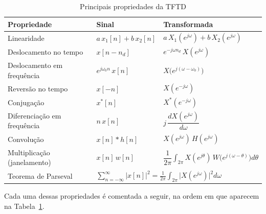 \documentclass[
    12pt,
    openright,
    oneside,
    a4paper,
    chapter=TITLE,
    section=TITLE,
    brazil
]{abntex2}
\begin{document}
\begin{table}[H]
\centering
\caption{Principais propriedades da TFTD}
\label{tab:propriedades}
\small
\begin{tabular}{@{}p{4.6cm}p{3.5cm}p{5.9cm}@{}}
\toprule
\textbf{Propriedade} & \textbf{Sinal} & \textbf{Transformada} \\
\midrule
Linearidade &
$a\,x_1[n] + b\,x_2[n]$ &
$a\,X_1(e^{j\omega}) + b\,X_2(e^{j\omega})$ \\[2pt]

Deslocamento no tempo &
$x[n-n_d]$ &
$e^{-j\omega n_d}\,X(e^{j\omega})$ \\[2pt]

Deslocamento em frequência &
$e^{j\omega_0 n}\,x[n]$ &
$X\big(e^{j(\omega-\omega_0)}\big)$ \\[2pt]

Reversão no tempo &
$x[-n]$ &
$X(e^{-j\omega})$ \\[2pt]

Conjugação &
$x^{*}[n]$ &
$X^{*}(e^{-j\omega})$ \\[2pt]

Diferenciação em frequência &
$n\,x[n]$ &
$j\,\dfrac{dX(e^{j\omega})}{d\omega}$ \\[2pt]

Convolução &
$x[n] * h[n]$ &
$X(e^{j\omega})\,H(e^{j\omega})$ \\[2pt]

Multiplicação (janelamento) &
$x[n]\,w[n]$ &
$\dfrac{1}{2\pi}\displaystyle\int_{2\pi} X(e^{j\theta})\,W\big(e^{j(\omega-\theta)}\big)d\theta$ \\[2pt]

Teorema de Parseval &
\multicolumn{2}{l}{$\displaystyle\sum_{n=-\infty}^{\infty}|x[n]|^2
 = \frac{1}{2\pi}\int_{2\pi}\big|X(e^{j\omega})\big|^2 d\omega$} \\
\bottomrule
\end{tabular}
\end{table}

Cada uma dessas propriedades é comentada a seguir, na ordem em que aparecem na
Tabela~\ref{tab:propriedades}.
\end{document}
